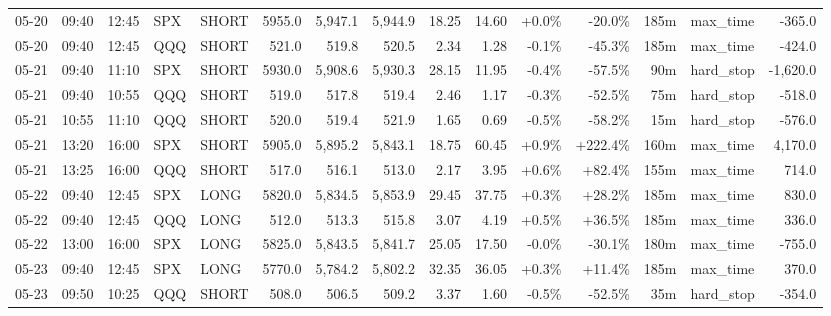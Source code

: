 \documentclass[11pt,a4paper,twoside]{article}
\begin{document}
\begin{landscape}
\begin{center}
\begin{longtable}{>{\color{txtmain}}l l l l l r r r r r r r r >{\color{txtmain}}l r}
05-20 & 09:40 & 12:45 & SPX & SHORT & 5955.0 & 5,947.1 & 5,944.9 & 18.25 & 14.60 & \textcolor{wingreen}{+0.0\%} & \textcolor{lossred}{-20.0\%} & 185m & max\_time & \textcolor{lossred}{-365.0} \\
05-20 & 09:40 & 12:45 & QQQ & SHORT & 521.0 & 519.8 & 520.5 & 2.34 & 1.28 & \textcolor{lossred}{-0.1\%} & \textcolor{lossred}{-45.3\%} & 185m & max\_time & \textcolor{lossred}{-424.0} \\
05-21 & 09:40 & 11:10 & SPX & SHORT & 5930.0 & 5,908.6 & 5,930.3 & 28.15 & 11.95 & \textcolor{lossred}{-0.4\%} & \textcolor{lossred}{-57.5\%} & 90m & hard\_stop & \textcolor{lossred}{-1,620.0} \\
05-21 & 09:40 & 10:55 & QQQ & SHORT & 519.0 & 517.8 & 519.4 & 2.46 & 1.17 & \textcolor{lossred}{-0.3\%} & \textcolor{lossred}{-52.5\%} & 75m & hard\_stop & \textcolor{lossred}{-518.0} \\
05-21 & 10:55 & 11:10 & QQQ & SHORT & 520.0 & 519.4 & 521.9 & 1.65 & 0.69 & \textcolor{lossred}{-0.5\%} & \textcolor{lossred}{-58.2\%} & 15m & hard\_stop & \textcolor{lossred}{-576.0} \\
05-21 & 13:20 & 16:00 & SPX & SHORT & 5905.0 & 5,895.2 & 5,843.1 & 18.75 & 60.45 & \textcolor{wingreen}{+0.9\%} & \textcolor{wingreen}{+222.4\%} & 160m & max\_time & \textcolor{wingreen}{4,170.0} \\
05-21 & 13:25 & 16:00 & QQQ & SHORT & 517.0 & 516.1 & 513.0 & 2.17 & 3.95 & \textcolor{wingreen}{+0.6\%} & \textcolor{wingreen}{+82.4\%} & 155m & max\_time & \textcolor{wingreen}{714.0} \\
05-22 & 09:40 & 12:45 & SPX & LONG & 5820.0 & 5,834.5 & 5,853.9 & 29.45 & 37.75 & \textcolor{wingreen}{+0.3\%} & \textcolor{wingreen}{+28.2\%} & 185m & max\_time & \textcolor{wingreen}{830.0} \\
05-22 & 09:40 & 12:45 & QQQ & LONG & 512.0 & 513.3 & 515.8 & 3.07 & 4.19 & \textcolor{wingreen}{+0.5\%} & \textcolor{wingreen}{+36.5\%} & 185m & max\_time & \textcolor{wingreen}{336.0} \\
05-22 & 13:00 & 16:00 & SPX & LONG & 5825.0 & 5,843.5 & 5,841.7 & 25.05 & 17.50 & \textcolor{lossred}{-0.0\%} & \textcolor{lossred}{-30.1\%} & 180m & max\_time & \textcolor{lossred}{-755.0} \\
05-23 & 09:40 & 12:45 & SPX & LONG & 5770.0 & 5,784.2 & 5,802.2 & 32.35 & 36.05 & \textcolor{wingreen}{+0.3\%} & \textcolor{wingreen}{+11.4\%} & 185m & max\_time & \textcolor{wingreen}{370.0} \\
05-23 & 09:50 & 10:25 & QQQ & SHORT & 508.0 & 506.5 & 509.2 & 3.37 & 1.60 & \textcolor{lossred}{-0.5\%} & \textcolor{lossred}{-52.5\%} & 35m & hard\_stop & \textcolor{lossred}{-354.0} \\

\end{longtable}
\end{center}
\end{landscape}
\end{document}
